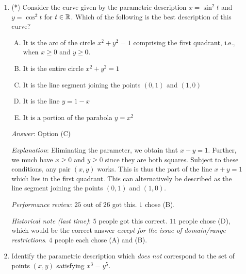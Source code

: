 \documentclass[10pt]{amsart}
\begin{document}
\begin{enumerate}
  {\em Answer}: Option (C)

  {\em Explanation}: Eliminating the parameter $t$, we get that $y =
  x$, but with the additional caveat that the value of $x$ (hence also
  $y$) must be in the range of $\arctan$. The range of $\arctan$ is
  the open interval $(-\pi/2,\pi/2)$, thus we get the corresponding
  line segment without endpoints joining the point with coordinates
  $(\pi/2,\pi/2)$ to the point with coordinates $(-\pi/2,-\pi/2)$.

  {\em Performance review}: $13$ out of $26$ got this. $10$ chose (D),
  $2$ chose (B), $1$ chose multiple options.

  {\em Historical note (last time)}: $8$ people got this correct. $9$ people
  chose (B), which would be the right idea {\em except for the issue
  of domain/range restrictions}. $4$ chose (D), $2$ chose (A), $1$
  chose (E).

\item (*) Consider the curve given by the parametric description $x =
  \sin^2t$ and $y = \cos^2t$ for $t \in \mathbb{R}$. Which of the
  following is the best description of this curve?

  \begin{enumerate}[(A)]
  \item It is the arc of the circle $x^2 + y^2 = 1$ comprising the
    first quadrant, i.e., when $x \ge 0$ and $y \ge 0$.
  \item It is the entire circle $x^2 + y^2 = 1$
  \item It is the line segment joining the points $(0,1)$ and $(1,0)$
  \item It is the line $y = 1 - x$
  \item It is a portion of the parabola $y = x^2$
  \end{enumerate}

  {\em Answer}: Option (C)

  {\em Explanation}: Eliminating the parameter, we obtain that $x + y
  = 1$. Further, we much have $x \ge 0$ and $y \ge 0$ since they are
  both squares. Subject to these conditions, any pair $(x,y)$
  works. This is thus the part of the line $x + y = 1$ which lies in
  the first quadrant. This can alternatively be described as the line
  segment joining the points $(0,1)$ and $(1,0)$.

  {\em Performance review}: $25$ out of $26$ got this. $1$ chose (B).

  {\em Historical note (last time)}: $5$ people got this correct. $11$ people
  chose (D), which would be the correct answer {\em except for the
  issue of domain/range restrictions}. $4$ people each chose (A) and
  (B).
\item Identify the parametric description which {\em does not}
  correspond to the set of points $(x,y)$ satisfying $x^3 = y^5$.


\end{enumerate}
\end{document}
